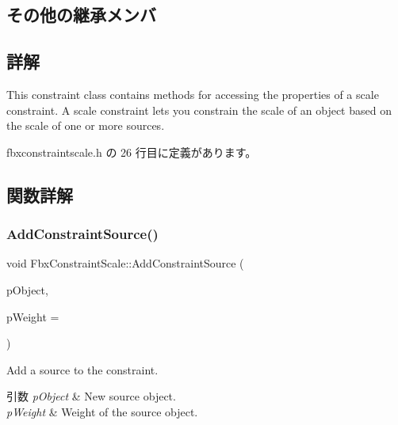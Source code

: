 \subsection*{その他の継承メンバ}


\subsection{詳解}
This constraint class contains methods for accessing the properties of a scale constraint. A scale constraint lets you constrain the scale of an object based on the scale of one or more sources. 

 fbxconstraintscale.\+h の 26 行目に定義があります。



\subsection{関数詳解}
\mbox{\label{class_fbx_constraint_scale_a876e788ab98cf2fe1042ae3c687b3689}} 
\subsubsection{\texorpdfstring{Add\+Constraint\+Source()}{AddConstraintSource()}}
{\footnotesize\ttfamily void Fbx\+Constraint\+Scale\+::\+Add\+Constraint\+Source (\begin{DoxyParamCaption}\item[{\hyperlink{class_fbx_object}{Fbx\+Object} $\ast$}]{p\+Object,  }\item[{double}]{p\+Weight = {} }\end{DoxyParamCaption})}

Add a source to the constraint. 
\begin{DoxyParams}{引数}
{\em p\+Object} & New source object. \\
\hline
{\em p\+Weight} & Weight of the source object. \\
\hline
\end{DoxyParams}
\mbox{\label{class_fbx_constraint_scale_af34ea4ce8516d69aefbcb9e83060b2c1}} 
